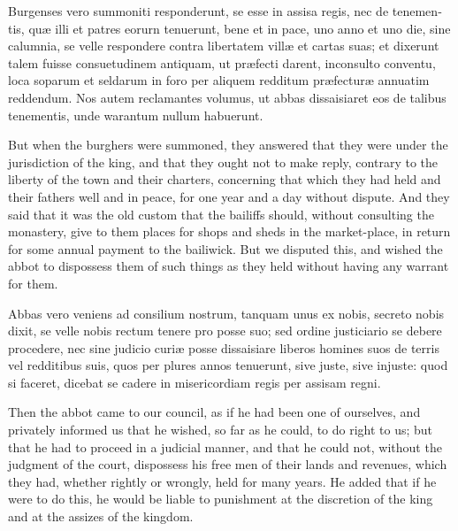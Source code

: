 \documentclass[10pt]{book}
\begin{document}
\begin{paracol}{2}
\switchcolumn*

\begin{otherlanguage}{latin}
Burgenses vero summoniti responderunt, se esse in assisa regis, nec de tenementis, qu\ae{} illi et patres eorurn tenuerunt, bene et in pace, uno anno et uno die, sine calumnia, se velle respondere contra libertatem vill\ae{} et cartas suas; et dixerunt talem fuisse consuetudinem antiquam, ut pr\ae{}fecti darent, inconsulto conventu, loca soparum et seldarum in foro per aliquem redditum pr\ae{}fectur\ae{} annuatim reddendum. Nos autem reclamantes volumus, ut abbas dissaisiaret eos de talibus tenementis, unde warantum nullum habuerunt.
\end{otherlanguage}

\switchcolumn

But when the burghers were summoned, they answered that they were under the jurisdiction of the king, and that they ought not to make reply, contrary to the liberty of the town and their charters, concerning that which they had held and their fathers well and in peace, for one year and a day without dispute. And they said that it was the old custom that the bailiffs should, without consulting the monastery, give to them places for shops and sheds in the market-place, in return for some annual payment to the bailiwick. But we disputed this, and wished the abbot to dispossess them of such things as they held without having any warrant for them.

\switchcolumn*

\begin{otherlanguage}{latin}
Abbas vero veniens ad consilium nostrum, tanquam unus ex nobis, secreto nobis dixit, se velle nobis rectum tenere pro posse suo; sed ordine justiciario se debere procedere, nec sine judicio curi\ae{} posse dissaisiare liberos homines suos de terris vel redditibus suis, quos per plures annos tenuerunt, sive juste, sive injuste: quod si faceret, dicebat se cadere in misericordiam regis per assisam regni.
\end{otherlanguage}

\switchcolumn

Then the abbot came to our council, as if he had been one of ourselves, and privately informed us that he wished, so far as he could, to do right to us; but that he had to proceed in a judicial manner, and that he could not, without the judgment of the court, dispossess his free men of their lands and revenues, which they had, whether rightly or wrongly, held for many years. He added that if he were to do this, he would be liable to punishment at the discretion of the king and at the assizes of the kingdom.


\end{paracol}
\end{document}
